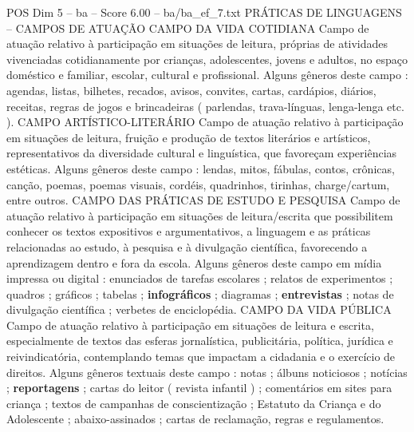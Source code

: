 \begin{textsample}{POS Dim 5 – ba – Score 6.00 – ba/ba\_ef\_7.txt}  \label{ex:f5_pos_273}
PRÁTICAS DE LINGUAGENS – CAMPOS DE ATUAÇÃO CAMPO DA VIDA COTIDIANA Campo de atuação relativo à participação em situações de leitura, próprias de atividades vivenciadas cotidianamente por crianças, adolescentes, jovens e adultos, no espaço doméstico e familiar, escolar, cultural e profissional.
Alguns gêneros deste campo : agendas, listas, bilhetes, recados, avisos, convites, cartas, cardápios, diários, receitas, regras de jogos e brincadeiras ( parlendas, trava-línguas, lenga-lenga etc. ).
CAMPO ARTÍSTICO-LITERÁRIO Campo de atuação relativo à participação em situações de leitura, fruição e produção de textos literários e artísticos, representativos da diversidade cultural e linguística, que favoreçam experiências estéticas.
Alguns gêneros deste campo : lendas, mitos, fábulas, contos, crônicas, canção, poemas, poemas visuais, cordéis, quadrinhos, tirinhas, charge/cartum, entre outros.
CAMPO DAS PRÁTICAS DE ESTUDO E PESQUISA Campo de atuação relativo à participação em situações de leitura/escrita que possibilitem conhecer os textos expositivos e argumentativos, a linguagem e as práticas relacionadas ao estudo, à pesquisa e à divulgação científica, favorecendo a aprendizagem dentro e fora da escola.
Alguns gêneros deste campo em mídia impressa ou digital : enunciados de tarefas escolares ; relatos de experimentos ; quadros ; gráficos ; tabelas ; \textbf{infográficos} ; diagramas ; \textbf{entrevistas} ; notas de divulgação científica ; verbetes de enciclopédia.
CAMPO DA VIDA PÚBLICA Campo de atuação relativo à participação em situações de leitura e escrita, especialmente de textos das esferas jornalística, publicitária, política, jurídica e reivindicatória, contemplando temas que impactam a cidadania e o exercício de direitos.
Alguns gêneros textuais deste campo : notas ; álbuns noticiosos ; notícias ; \textbf{reportagens} ; cartas do leitor ( revista infantil ) ; comentários em sites para criança ; textos de campanhas de conscientização ; Estatuto da Criança e do Adolescente ; abaixo-assinados ; cartas de reclamação, regras e regulamentos.

\end{textsample}
